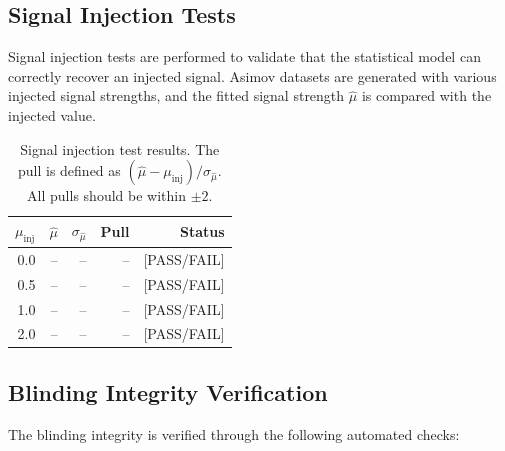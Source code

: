 \subsection{Signal Injection Tests}
\label{sec:blinding:injection}


Signal injection tests are performed to validate that the statistical model
can correctly recover an injected signal. Asimov datasets are generated with
various injected signal strengths, and the fitted signal strength
$\hat{\mu}$ is compared with the injected value.

\begin{table}[htbp]
  \centering
  \caption{Signal injection test results. The pull is defined as
           $(\hat{\mu} - \mu_\text{inj}) / \sigma_{\hat{\mu}}$.
           All pulls should be within $\pm 2$.}
  \label{tab:injection}
  \begin{tabular}{rrrrr}
    \toprule
    $\mu_\text{inj}$ & $\hat{\mu}$ & $\sigma_{\hat{\mu}}$
      & Pull & Status \\
    \midrule
    0.0 & -- & -- & -- & [PASS/FAIL] \\
    0.5 & -- & -- & -- & [PASS/FAIL] \\
    1.0 & -- & -- & -- & [PASS/FAIL] \\
    2.0 & -- & -- & -- & [PASS/FAIL] \\
    \bottomrule
  \end{tabular}
\end{table}

\subsection{Blinding Integrity Verification}
\label{sec:blinding:integrity}


The blinding integrity is verified through the following automated checks:

